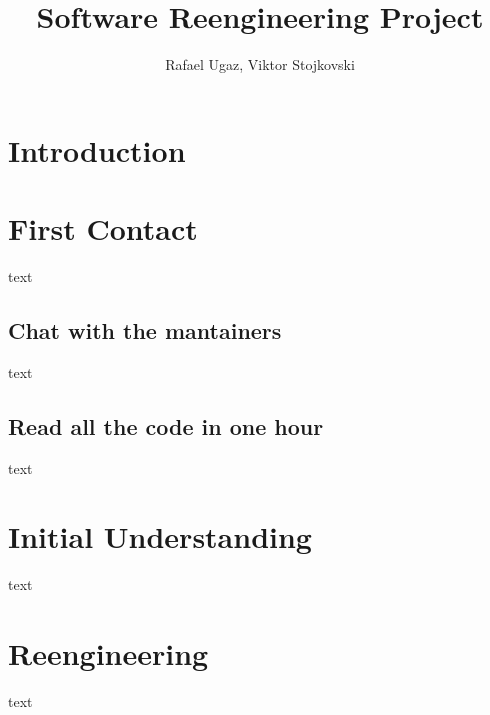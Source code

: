 \documentclass[11pt]{article} %
\title{Software Reengineering Project}
\author{Rafael Ugaz, Viktor Stojkovski}
\date{} %
\begin{document}
\maketitle

\section{Introduction}

\section{First Contact}

text

\subsection{Chat with the mantainers}
text

\subsection{Read all the code in one hour}
text

\section{Initial Understanding}
text

\section{Reengineering}
text
\end{document}
